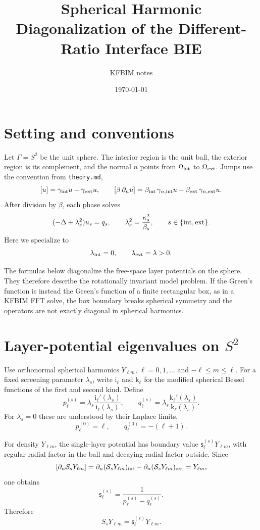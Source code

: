 \documentclass[11pt]{article}
\title{Spherical Harmonic Diagonalization of the Different-Ratio Interface BIE}
\author{KFBIM notes}
\date{\today}
\newcommand{\Gint}{\Omega_{\rm int}}
\newcommand{\Gext}{\Omega_{\rm ext}}
\newcommand{\bi}{\beta_{\rm int}}
\newcommand{\be}{\beta_{\rm ext}}
\newcommand{\Ylm}{Y_{\ell m}}
\begin{document}
\maketitle

\section*{Setting and conventions}

Let $\Gamma=S^2$ be the unit sphere.  The interior region is the unit ball,
the exterior region is its complement, and the normal $n$ points from
$\Gint$ to $\Gext$.  Jumps use the convention from \texttt{theory.md},
\[
    [u]=\gamma_{\rm int}u-\gamma_{\rm ext}u,
    \qquad
    [\beta\,\partial_n u]
    =
    \bi\,\gamma_{n,{\rm int}}u
    -
    \be\,\gamma_{n,{\rm ext}}u .
\]
After division by $\beta$, each phase solves
\[
    (-\Delta+\lambda_s^2)u_s=q_s,
    \qquad
    \lambda_s^2=\frac{\kappa_s^2}{\beta_s},
    \qquad s\in\{{\rm int},{\rm ext}\}.
\]
Here we specialize to
\[
    \lambda_{\rm int}=0,
    \qquad
    \lambda_{\rm ext}=\lambda>0 .
\]

The formulas below diagonalize the free-space layer potentials on the sphere.
They therefore describe the rotationally invariant model problem.  If the
Green's function is instead the Green's function of a finite rectangular box,
as in a KFBIM FFT solve, the box boundary breaks spherical symmetry and the
operators are not exactly diagonal in spherical harmonics.

\section*{Layer-potential eigenvalues on $S^2$}

Use orthonormal spherical harmonics $\Ylm$, $\ell=0,1,\dots$ and
$-\ell\le m\le\ell$.  For a fixed screening parameter $\lambda_s$, write
$\mathrm{i}_\ell$ and $\mathrm{k}_\ell$ for the modified spherical Bessel
functions of the first and second kind.  Define
\[
    p_\ell^{(s)}
    =
    \lambda_s
    \frac{\mathrm{i}_\ell'(\lambda_s)}
         {\mathrm{i}_\ell(\lambda_s)},
    \qquad
    q_\ell^{(s)}
    =
    \lambda_s
    \frac{\mathrm{k}_\ell'(\lambda_s)}
         {\mathrm{k}_\ell(\lambda_s)} .
\]
For $\lambda_s=0$ these are understood by their Laplace limits,
\[
    p_\ell^{(0)}=\ell,
    \qquad
    q_\ell^{(0)}=-(\ell+1).
\]

For density $\Ylm$, the single-layer potential has boundary value
$\mathsf{s}_\ell^{(s)}\Ylm$, with regular radial factor in the ball and
decaying radial factor outside.  Since
\[
    [\partial_n \mathcal{S}_s\Ylm]
    =
    \partial_n(\mathcal{S}_s\Ylm)_{\rm int}
    -
    \partial_n(\mathcal{S}_s\Ylm)_{\rm ext}
    =
    \Ylm,
\]
one obtains
\[
    \boxed{
    \mathsf{s}_\ell^{(s)}
    =
    \frac{1}{p_\ell^{(s)}-q_\ell^{(s)}} .
    }
\]
Therefore
\[
    S_s\Ylm=\mathsf{s}_\ell^{(s)}\Ylm .
\]
\end{document}

